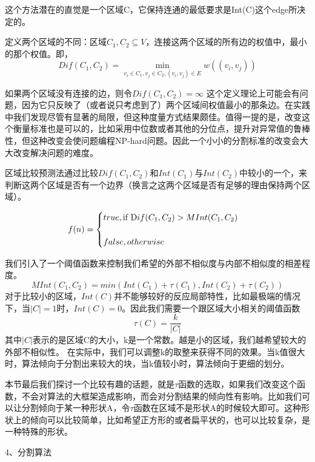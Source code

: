 这个方法潜在的直觉是一个区域C，它保持连通的最低要求是Int(C)这个edge所决定的。

定义两个区域的不同：区域\(C_1,C_2 \subseteq V\)，连接这两个区域的所有边的权值中，最小的那个权值。即，
\begin{equation}
Dif(C_1,C_2) = \mathop {\min }\limits_{v_i \in C_1 ,v_j \in C_2, (v_i,v_j) \in E}w((v_i,v_j))
\end{equation}

如果两个区域没有连接的边，则令\(Dif(C_1,C_2) = \infty\)
这个定义理论上可能会有问题，因为它只反映了（或者说只考虑到了）两个区域间权值最小的那条边。在实践中我们发现尽管有显著的局限，但这种度量方式结果颇佳。值得一提的是，改变这个衡量标准也是可以的，比如采用中位数或者其他的分位点，提升对异常值的鲁棒性，但这种改变会使问题编程NP-hard问题。因此一个小小的分割标准的改变会大大改变解决问题的难度。

区域比较预测法通过比较\(Dif(C_1,C_2)\)和\(Int(C_1)\)与\(Int(C_2)\)中较小的一个，来判断这两个区域是否有一个边界（换言之这两个区域是否有足够的理由保持两个区域）。

\begin{equation}
f(n) =\begin{cases} 
true,   \mbox {if } \mbox Dif(C_1,C_2) > M Int(C_1,C_2)\\\\
false,  otherwise \end{cases}
\end{equation}

我们引入了一个阈值函数来控制我们希望的外部不相似度与内部不相似度的相差程度。
\begin{equation}
MInt(C_1,C_2) = min(Int(C_1) + \tau(C_1),Int(C_2) + \tau(C_2))
\end{equation}
对于比较小的区域，\(Int(C)\)并不能够较好的反应局部特性，比如最极端的情况下，当\(|C| = 1\)时，\(Int(C) = 0\)。因此我们需要一个跟区域大小相关的阈值函数
\[\tau (C) = \frac{k}{|C|}\]
其中\(|C|\)表示的是区域C的大小，k是一个常数。越是小的区域，我们越希望较大的外部不相似性。
在实际中，我们可以调整k的取整来获得不同的效果。当k值很大时，算法倾向于分割出来较大的块，当k值较小时，算法倾向于更细的划分。

本节最后我们探讨一个比较有趣的话题，就是\(\tau\)函数的选取，如果我们改变这个函数，不会对算法的大框架造成影响，而会对分割结果的倾向性有影响。比如我们可以让分割倾向于某一种形状A，令\(\tau\)函数在区域不是形状A的时候较大即可。这种形状上的倾向可以比较简单，比如希望正方形的或者扁平状的，也可以比较复杂，是一种特殊的形状。

4、分割算法

